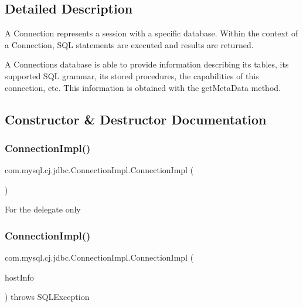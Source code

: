 \subsection{Detailed Description}
A Connection represents a session with a specific database. Within the context of a Connection, S\+QL statements are executed and results are returned.

A Connection\textquotesingle{}s database is able to provide information describing its tables, its supported S\+QL grammar, its stored procedures, the capabilities of this connection, etc. This information is obtained with the get\+Meta\+Data method. 

\subsection{Constructor \& Destructor Documentation}
\mbox{\label{classcom_1_1mysql_1_1cj_1_1jdbc_1_1_connection_impl_ac7a247f4c4dbd5b4867c8bed3b8e882b}} 
\subsubsection{\texorpdfstring{Connection\+Impl()}{ConnectionImpl()}\hspace{0.1cm}{\footnotesize\ttfamily [1/2]}}
{\footnotesize\ttfamily com.\+mysql.\+cj.\+jdbc.\+Connection\+Impl.\+Connection\+Impl (\begin{DoxyParamCaption}{ }\end{DoxyParamCaption})\hspace{0.3cm}{\ttfamily [protected]}}

\textquotesingle{} For the delegate only \mbox{\label{classcom_1_1mysql_1_1cj_1_1jdbc_1_1_connection_impl_a821f9640583d1b2daea0424f3b0ea945}} 
\subsubsection{\texorpdfstring{Connection\+Impl()}{ConnectionImpl()}\hspace{0.1cm}{\footnotesize\ttfamily [2/2]}}
{\footnotesize\ttfamily com.\+mysql.\+cj.\+jdbc.\+Connection\+Impl.\+Connection\+Impl (\begin{DoxyParamCaption}\item[{\mbox{\hyperlink{classcom_1_1mysql_1_1cj_1_1conf_1_1_host_info}{Host\+Info}}}]{host\+Info }\end{DoxyParamCaption}) throws S\+Q\+L\+Exception}

